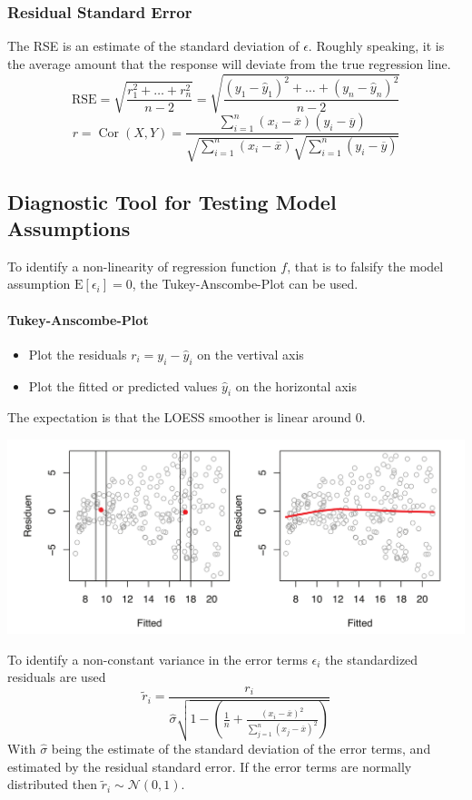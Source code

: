 \documentclass[11pt]{article}
\newcommand*\samplemean[1]{\overline{#1}}
\newcommand*\ev[1]{\mathrel{\text{E}\left[#1\right]}}
\newcommand*\N[1]{\mathcal{N}\left(#1\right)}
\newcommand*\Cor[1]{\mathop{\text{Cor}}\left(#1\right)}
\begin{document}
\subsubsection{Residual Standard Error}
The RSE is an estimate of the standard deviation of $\epsilon$. Roughly speaking, it is the average amount that the response will deviate from the true regression line.
\begin{equation*}
	\text{RSE} = \sqrt{\frac{r_1^2 + \dots + r_n^2}{n-2}} = \sqrt{\frac{(y_1 - \hat{y}_1)^2 + \dots + (y_n - \hat{y}_n)^2}{n-2}}
\end{equation*}
\begin{equation*}
	r = \Cor{X,Y} = \frac{\sum_{i=1}^{n}(x_i - \samplemean{x})(y_i - \samplemean{y})}{\sqrt{\sum_{i=1}^{n} (x_i - \samplemean{x})}\sqrt{\sum_{i=1}^{n} (y_i - \samplemean{y})}}
\end{equation*}

\subsection{Diagnostic Tool for Testing Model Assumptions}
To identify a non-linearity of regression function $f$, that is to falsify the model assumption $\ev{\epsilon_i} = 0$, the Tukey-Anscombe-Plot can be used.\\
\paragraph{Tukey-Anscombe-Plot}
\begin{itemize}
	\item Plot the residuals $r_i = y_i - \hat{y}_i$ on the vertival axis
	\item Plot the fitted or predicted values $\hat{y}_i$ on the horizontal axis
\end{itemize}
The expectation is that the LOESS smoother is linear around 0.
\begin{center}
	\includegraphics[width=0.8\linewidth]{img/LOESS_smoother}
\end{center}
To identify a non-constant variance in the error terms $\epsilon_i$ the standardized residuals are used
\begin{equation*}
	\tilde{r}_i = \frac{r_i}{\hat{\sigma}\sqrt{1 - \left( \frac{1}{n} + \frac{(x_i - \samplemean{x})^2}{\sum_{j=1}^{n}(x_j - \samplemean{x})^2} \right)}}
\end{equation*}
With $\hat{\sigma}$ being the estimate of the standard deviation of the error terms, and estimated by the residual standard error. If the error terms are normally distributed then $\tilde{r}_i \sim \N{0,1}$.
\end{document}

